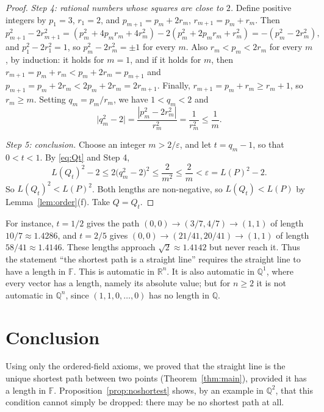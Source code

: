 \documentclass[11pt]{article}
\theoremstyle{plain}
\theoremstyle{definition}
\theoremstyle{remark}
\begin{document}
\begin{proof}
\emph{Step 4: rational numbers whose squares are close to $2$.} Define positive integers by $p_1 = 3$, $r_1 = 2$, and $p_{m+1} = p_m + 2r_m$, $r_{m+1} = p_m + r_m$. Then
\begin{equation}
    p_{m+1}^2 - 2r_{m+1}^2 = (p_m^2 + 4p_m r_m + 4r_m^2) - 2(p_m^2 + 2p_m r_m + r_m^2) = -(p_m^2 - 2r_m^2),
\end{equation}
and $p_1^2 - 2r_1^2 = 1$, so $p_m^2 - 2r_m^2 = \pm 1$ for every $m$. Also $r_m < p_m < 2r_m$ for every $m$, by induction: it holds for $m = 1$, and if it holds for $m$, then $r_{m+1} = p_m + r_m < p_m + 2r_m = p_{m+1}$ and $p_{m+1} = p_m + 2r_m < 2p_m + 2r_m = 2r_{m+1}$. Finally, $r_{m+1} = p_m + r_m \geq r_m + 1$, so $r_m \geq m$. Setting $q_m = p_m / r_m$, we have $1 < q_m < 2$ and
\begin{equation}
    \bigl|q_m^2 - 2\bigr| = \frac{|p_m^2 - 2r_m^2|}{r_m^2} = \frac{1}{r_m^2} \leq \frac{1}{m}.
\end{equation}

\emph{Step 5: conclusion.} Choose an integer $m > 2/\varepsilon$, and let $t = q_m - 1$, so that $0 < t < 1$. By \eqref{eq:Qt} and Step 4,
\begin{equation}
    L(Q_t)^2 - 2 \leq 2\bigl(q_m^2 - 2\bigr)^2 \leq \frac{2}{m^2} \leq \frac{2}{m} < \varepsilon = L(P)^2 - 2.
\end{equation}
So $L(Q_t)^2 < L(P)^2$. Both lengths are non-negative, so $L(Q_t) < L(P)$ by Lemma~\ref{lem:order}(f). Take $Q = Q_t$.
\end{proof}

For instance, $t = 1/2$ gives the path $(0,0) \to (3/7, 4/7) \to (1,1)$ of length $10/7 \approx 1.4286$, and $t = 2/5$ gives $(0,0) \to (21/41, 20/41) \to (1,1)$ of length $58/41 \approx 1.4146$. These lengths approach $\sqrt{2} \approx 1.4142$ but never reach it. Thus the statement ``the shortest path is a straight line'' requires the straight line to have a length in $\mathbb{F}$. This is automatic in $\mathbb{R}^n$. It is also automatic in $\mathbb{Q}^1$, where every vector has a length, namely its absolute value; but for $n \geq 2$ it is not automatic in $\mathbb{Q}^n$, since $(1, 1, 0, \dots, 0)$ has no length in $\mathbb{Q}$.

\section{Conclusion}

Using only the ordered-field axioms, we proved that the straight line is the unique shortest path between two points (Theorem~\ref{thm:main}), provided it has a length in $\mathbb{F}$. Proposition~\ref{prop:noshortest} shows, by an example in $\mathbb{Q}^2$, that this condition cannot simply be dropped: there may be no shortest path at all.
\end{document}
